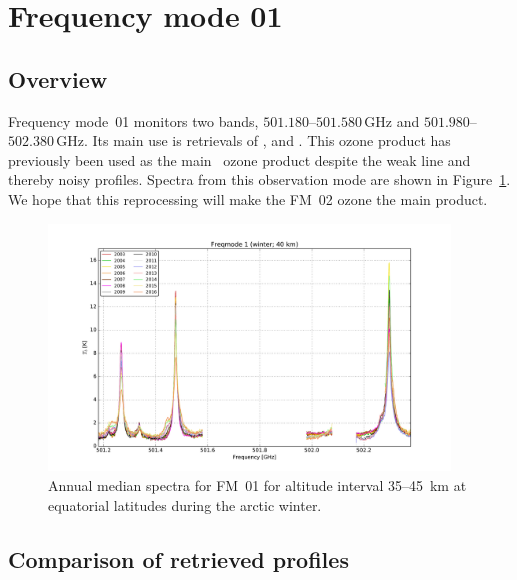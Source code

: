\section{Frequency mode 01}
\label{sec:fm01}

\subsection{Overview}
\label{sec:fm01:overview}
Frequency mode~01 monitors two bands, $501.180$--$501.580\,\mathrm{GHz}$ and
$501.980$--$502.380\,\mathrm{GHz}$. Its main use is retrievals of ,
 and . This ozone product has previously been used as
the main \smr\ ozone product despite the weak line and thereby noisy profiles.
Spectra from this observation mode are shown in Figure~\ref{fig:spectra:01}.
We hope that this reprocessing will make the FM~02 ozone the main product.


\begin{figure}[ht]
    \centering
    \includegraphics[width=0.95\textwidth]{../DDS/figures/spectra/fm_01_spectra_winter}
    \caption{Annual median spectra for FM~01 for altitude interval 35--45~km at
        equatorial latitudes during the arctic winter.
    }\label{fig:spectra:01}
\end{figure}


\subsection{Comparison of retrieved profiles}
\label{sec:fm01:comparison}



